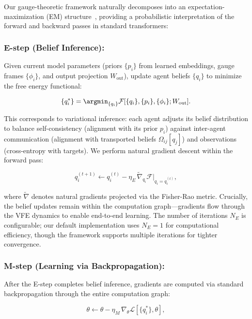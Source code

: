 \documentclass[twoside,11pt]{article}
\begin{document}
Our gauge-theoretic framework naturally decomposes into an expectation-maximization (EM) structure~\citep{dempster1977maximum}, providing a probabilistic interpretation of the forward and backward passes in standard transformers:

\subsubsection{E-step (Belief Inference):} Given current model parameters (priors $\{p_i\}$ from learned embeddings, gauge frames $\{\phi_i\}$, and output projection $W_{\text{out}}$), update agent beliefs $\{q_i\}$ to minimize the free energy functional:

\begin{equation}
\{q_i^*\} = \argmin_{\{q_i\}} \mathcal{F}[\{q_i\}, \{p_i\}, \{\phi_i\}; W_{\text{out}}].
\label{eq:e_step}
\end{equation}

This corresponds to variational inference: each agent adjusts its belief distribution to balance self-consistency (alignment with its prior $p_i$) against inter-agent communication (alignment with transported beliefs $\Omega_{ij}[q_j]$) and observations (cross-entropy with targets). We perform natural gradient descent within the forward pass:

\begin{equation}
q_i^{(t+1)} \leftarrow q_i^{(t)} - \eta_E \, \tilde{\nabla}_{q_i} \mathcal{F}|_{q_i = q_i^{(t)}},
\end{equation}

where $\tilde{\nabla}$ denotes natural gradients projected via the Fisher-Rao metric. Crucially, the belief updates remain within the computation graph---gradients flow through the VFE dynamics to enable end-to-end learning. The number of iterations $N_E$ is configurable; our default implementation uses $N_E = 1$ for computational efficiency, though the framework supports multiple iterations for tighter convergence.

\subsubsection{M-step (Learning via Backpropagation):}

After the E-step completes belief inference, gradients are computed via standard backpropagation through the entire computation graph:

\begin{equation}
\theta \leftarrow \theta - \eta_M \, \nabla_{\theta} \mathcal{L}[\{q_i^*\}, \theta],
\label{eq:m_step}
\end{equation}
\end{document}
